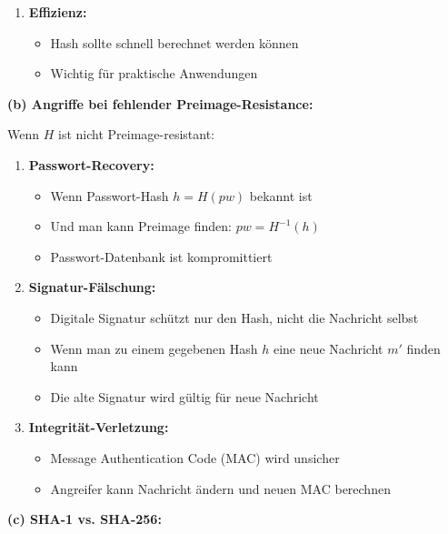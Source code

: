 \documentclass[12pt,a4paper]{article}
\begin{document}
\begin{tcolorbox}[colback=solutionbg, colframe=black!30]
\begin{enumerate}[1.]
    \item \textbf{Effizienz:}
    \begin{itemize}
        \item Hash sollte schnell berechnet werden können
        \item Wichtig für praktische Anwendungen
    \end{itemize}
\end{enumerate}

\end{tcolorbox}
\begin{tcolorbox}[colback=solutionbg, colframe=black!30]

\textbf{(b) Angriffe bei fehlender Preimage-Resistance:} \checkmark

Wenn $H$ ist nicht Preimage-resistant:

\begin{enumerate}[1.]
    \item \textbf{Passwort-Recovery:}
    \begin{itemize}
        \item Wenn Passwort-Hash $h = H(pw)$ bekannt ist
        \item Und man kann Preimage finden: $pw = H^{-1}(h)$
        \item Passwort-Datenbank ist kompromittiert
    \end{itemize}
    
    \item \textbf{Signatur-Fälschung:}
    \begin{itemize}
        \item Digitale Signatur schützt nur den Hash, nicht die Nachricht selbst
        \item Wenn man zu einem gegebenen Hash $h$ eine neue Nachricht $m'$ finden kann
        \item Die alte Signatur wird gültig für neue Nachricht
    \end{itemize}
    
    \item \textbf{Integrität-Verletzung:}
    \begin{itemize}
        \item Message Authentication Code (MAC) wird unsicher
        \item Angreifer kann Nachricht ändern und neuen MAC berechnen
    \end{itemize}
\end{enumerate}

\textbf{(c) SHA-1 vs. SHA-256:} \checkmark


\end{tcolorbox}
\end{document}
